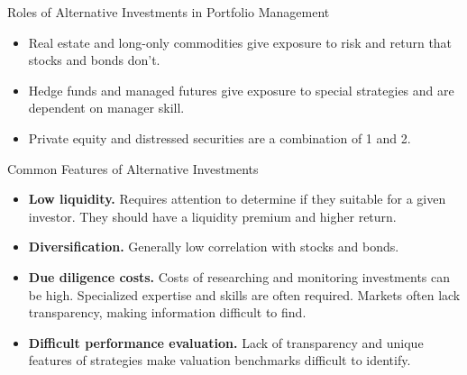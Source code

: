 \documentclass[../custom,grid]{flashcards}
\begin{document}

\begin{flashcard}{Roles of Alternative Investments in Portfolio Management}
    \begin{itemize}
        \item Real estate and long-only commodities give exposure to risk and return that stocks and bonds don't.
        \item Hedge funds and managed futures give exposure to special strategies and are dependent on manager skill.
        \item Private equity and distressed securities are a combination of 1 and 2.
    \end{itemize}
\end{flashcard}

\begin{flashcard}{Common Features of Alternative Investments}
    \begin{itemize}
        \item \textbf{Low liquidity.} Requires attention to determine if they suitable for a given investor. They should have a liquidity premium and higher return.
        \item \textbf{Diversification.} Generally low correlation with stocks and bonds.
        \item \textbf{Due diligence costs.} Costs of researching and monitoring investments can be high. Specialized expertise and skills are often required. Markets often lack transparency, making information difficult to find.
        \item \textbf{Difficult performance evaluation.} Lack of transparency and unique features of strategies make valuation benchmarks difficult to identify.
    \end{itemize}
\end{flashcard}
\end{document}

